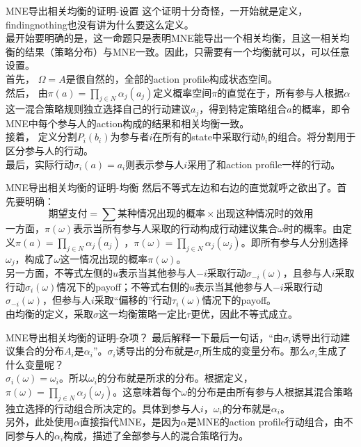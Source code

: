 \documentclass{beamer}
\begin{document}
\begin{frame}[label = MNE_and_correlated_equilibrium_explanation_1]{MNE导出相关均衡的证明-设置}
	这个证明十分奇怪，一开始就是定义，findingnothing也没有讲为什么要这么定义。\\
	最开始要明确的是，这一命题只是表明MNE能导出一个相关均衡，且这一相关均衡的结果（策略分布）与MNE一致。因此，只需要有一个均衡就可以，可以任意设置。\\
	\alert{首先，} $\Omega = A$是很自然的，全部的action profile构成状态空间。\\
	\alert{然后，} 由$\pi\left(a\right)=\prod\limits_{j\in N} \alpha_{j}\left(a_{j}\right)$定义概率空间$\pi$的直觉在于，所有参与人根据$\alpha$这一混合策略规则\alert{独立}选择自己的行动建议$a_{j}$，得到特定策略组合$a$的概率，即令MNE中每个参与人的action构成的结果和相关均衡一致。\\
	\alert{接着，} 定义分割$P_i(b_i)$为参与者$i$在所有的state中采取行动$b_{i}$的组合。将分割用于区分参与人的行动。\\
	\alert{最后，}实际行动$\sigma_{i}\left(a\right)=a_{i}$则表示参与人$i$采用了和action profile一样的行动。
\end{frame}
\begin{frame}[label = MNE_and_correlated_equilibrium_explanation_2]{MNE导出相关均衡的证明-均衡}
	然后不等式左边和右边的直觉就呼之欲出了。首先要明确：
	$$\text{期望支付}=\sum\limits \text{某种情况出现的概率}\times \text{出现这种情况时的效用}$$
	一方面，$\pi\left(\omega\right)$表示当所有参与人采取的行动构成行动建议集合$\omega$时的概率。由定义$\pi\left(a\right)=\prod\limits_{j\in N} \alpha_{j}\left(a_{j}\right)$ ，$\pi\left(\omega\right)=\prod\limits_{j\in N} \alpha_{j}\left(\omega_{j}\right)$。即所有参与人分别选择$\omega_{j}$，构成了$\omega$这一情况出现的概率$\pi\left(\omega\right)$。\\
	另一方面，不等式左侧的$u$表示当其他参与人$-i$采取行动$\sigma_{-i}\left(\omega\right)$，且参与人$i$采取行动$\sigma_{i}\left(\omega\right)$情况下的payoff；不等式右侧的$u$表示当其他参与人$-i$采取行动$\sigma_{-i}\left(\omega\right)$，但参与人$i$采取“偏移的”行动$\tau_{i}\left(\omega\right)$情况下的payoff。\\
	由均衡的定义，采取$\sigma$这一均衡策略一定比$\tau$更优，因此不等式成立。\\

\end{frame}

\begin{frame}[label = MNE_and_correlated_equilibrium_explanation_3]{MNE导出相关均衡的证明-杂项？}
	最后解释一下最后一句话，“由$\sigma_{i}$诱导出行动建议集合的分布$A_{i}$是$\alpha_{i}$”。$\sigma_{i}$诱导出的分布就是$\sigma_{i}$所生成的变量分布。那么$\sigma_{i}$生成了什么变量呢？\\
	$\sigma_{i}\left(\omega\right)=\omega_{i}$。所以$\omega_{i}$的分布就是所求的分布。根据定义，$\pi(\omega) = \prod_{j \in N} \alpha_j(\omega_j)$。这意味着每个$\omega$的分布是由所有参与人根据其混合策略独立选择的行动组合所决定的。具体到参与人$i$，$\omega_i$的分布就是$\alpha_i$。\\
	另外，此处使用$\alpha$直接指代MNE，是因为$\alpha$是MNE的action profile行动组合，由不同参与人的$\alpha_{i}$构成，描述了全部参与人的混合策略行为。
\end{frame}
\end{document}
